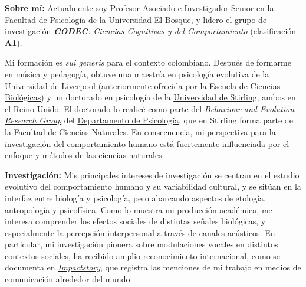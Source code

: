 \documentclass[11pt,a4paper,]{awesome-cv}
\begin{document}
\begin{footnotesize}

\textbf{Sobre mí:} Actualmente soy Profesor Asociado e \href{https://scienti.minciencias.gov.co/cvlac/visualizador/generarCurriculoCv.do?cod_rh=0001348945}{Investigador Senior} en la Facultad de Psicología de la Universidad El Bosque, y lidero el grupo de investigación \href{https://investigaciones.unbosque.edu.co/codec}{\textit{\textbf{CODEC}: Ciencias Cognitivas y del Comportamiento}} (clasificación \textbf{\href{https://scienti.minciencias.gov.co/gruplac/jsp/visualiza/visualizagr.jsp?nro=00000000001446}{A1}}). 

Mi formación es \textit{sui generis} para el contexto colombiano. Después de formarme en música y pedagogía, obtuve una maestría en psicología evolutiva de la \href{https://www.liverpool.ac.uk/}{Universidad de Liverpool} (anteriormente ofrecida por la \href{https://www.liverpool.ac.uk/life-sciences/}{Escuela de Ciencias Biológicas}) y un doctorado en psicología de la \href{https://www.stir.ac.uk/}{Universidad de Stirling}, ambos en el Reino Unido. El doctorado lo realicé como parte del \textit{\href{https://www.stir.ac.uk/about/faculties/natural-sciences/our-research/research-groups/behaviour-and-evolution-research-group/}{Behaviour and Evolution Research Group}} del \href{https://www.stir.ac.uk/about/faculties/natural-sciences/psychology/}{Departamento de Psicología}, que en Stirling forma parte de la \href{https://www.stir.ac.uk/about/faculties/natural-sciences/departments/}{Facultad de Ciencias Naturales}. En consecuencia, mi perspectiva para la investigación del comportamiento humano está fuertemente influenciada por el enfoque y métodos de las ciencias naturales.

\textbf{Investigación:} Mis principales intereses de investigación se centran en el estudio evolutivo del comportamiento humano y su variabilidad cultural, y se sitúan en la interfaz entre biología y psicología, pero abarcando aspectos de etología, antropología y psicofísica. Como lo muestra mi producción académica, me interesa comprender los efectos sociales de distintas señales biológicas, y especialmente la percepción interpersonal a través de canales acústicos. En particular, mi investigación pionera sobre modulaciones vocales en distintos contextos sociales, ha recibido amplio reconocimiento internacional, como se documenta en \href{https://profiles.impactstory.org/u/0000-0002-0092-6298}{\textit{Impactstory}}, que registra las menciones de mi trabajo en medios de comunicación alrededor del mundo.


\end{footnotesize}
\end{document}
